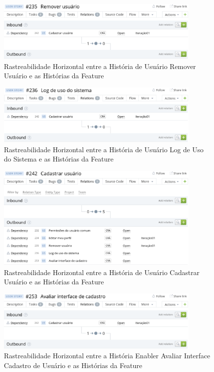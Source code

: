   \begin{figure}[!htb]
    \centering
    \includegraphics[width=10cm, keepaspectratio=false]{figuras/rastreabilidade/horizontal/gerenciar_usuario/historia_remover_usuario.eps}
    \caption{Rastreabilidade Horizontal entre a História de Usuário Remover Usuário e as Histórias da Feature}
  \end{figure}

  \begin{figure}[!htb]
    \centering
    \includegraphics[width=10cm, keepaspectratio=false]{figuras/rastreabilidade/horizontal/gerenciar_usuario/historia_log.eps}
    \caption{Rastreabilidade Horizontal entre a História de Usuário Log de Uso do Sistema e as Histórias da Feature}
  \end{figure}


  \begin{figure}[!htb]
    \centering
    \includegraphics[width=10cm, keepaspectratio=false]{figuras/rastreabilidade/horizontal/gerenciar_usuario/historia_cadastrar_usuario.eps}
    \caption{Rastreabilidade Horizontal entre a História de Usuário Cadastrar Usuário e as Histórias da Feature}
  \end{figure}

  \begin{figure}[!htb]
    \centering
    \includegraphics[width=10cm, keepaspectratio=false]{figuras/rastreabilidade/horizontal/gerenciar_usuario/historia_avaliar_cadastro.eps}
    \caption{Rastreabilidade Horizontal entre a História Enabler Avaliar Interface Cadastro de Usuário e as Histórias da Feature}
  \end{figure}

